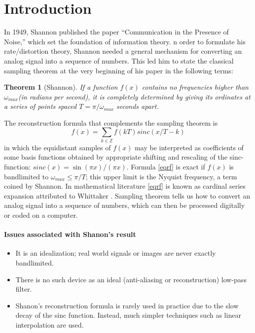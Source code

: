 \documentclass[reqno,9pt]{amsart}
\theoremstyle{plain}
\newtheorem{thm}{Theorem}
\theoremstyle{definition}
\newcommand{\bb}[1]{\mathbb{#1}}
\begin{document}
\section{\bf \large Introduction}
    In 1949, Shannon published the paper “Communication in
    the Presence of Noise,” which set the foundation of information theory. n order to formulate his rate/distortion theory, Shannon needed a general mechanism for converting an analog signal into a sequence of numbers. This led him to state the classical sampling theorem at the very beginning of his paper in the following terms:
    \begin{thm}[Shannon]
        If a function $f(x)$ contains no frequencies higher than $\omega_{max}$(in radians per second), it is completely determined by giving its ordinates at a series of points spaced $T = \pi/\omega_{max}$ seconds apart.
    \end{thm}
    The reconstruction formula that complements the sampling theorem is 
    \begin{equation}\label{eqrf}
        f(x) = \sum_{k\in \bb Z} f(kT) sinc(x/T-k)
    \end{equation}
    in which the equidistant samples of $f(x)$ may be interpreted as coefficients of some basis functions obtained by appropriate shifting and rescaling of the sinc-function: $sinc(x) = \sin(\pi x)/(\pi x)$. Formula \ref{eqrf} is exact if $f(x)$ is bandlimited to $\omega_{max} \leq \pi/T$; this upper limit is the Nyquist frequency, a term coined by Shannon. In mathematical literature \ref{eqrf} is known as cardinal series expansion attributed to Whittaker \cite{Whittaker_1915,PLB1983}. Sampling theorem tells us how to convert an analog signal into a sequence of numbers, which can then be processed digitally or coded on a computer. 

    \paragraph{\bf Issues associated with Shanon's result}
    \begin{itemize}
        \item It is an idealization; real world signals or images are never exactly bandlimited.
        \item There is no such device as an ideal (anti-aliasing or reconstruction) low-pass filter.
        \item Shanon's reconstruction formula is rarely used in practice due to the slow decay of the sinc function. Instead, much simpler techniques such as linear interpolation are used.
    \end{itemize}
\end{document}
